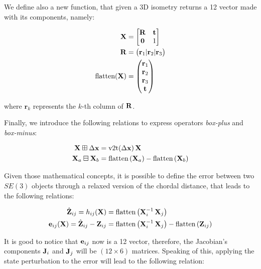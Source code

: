 We define also a new function, that given a 3D isometry returns a 12 vector made with its components, namely:

\begin{align}
    \mathbf{X} &= 
        \begin{bmatrix}
            \mathbf{R} & \mathbf{t} \\ \mathbf{0} & 1
        \end{bmatrix} \nonumber \\
    \mathbf{R} &= \begin{pmatrix} \mathbf{r}_1 | \mathbf{r}_2 | \mathbf{r}_3 \end{pmatrix} \nonumber \\
    \text{flatten}(\mathbf{X}) &= \begin{pmatrix} \mathbf{r}_1 \\ \mathbf{r}_2 \\ \mathbf{r}_3 \\ \mathbf{t} \end{pmatrix}
    \label{eq:flatten_isometry_operator}
\end{align}

\noindent where $\mathbf{r}_k$ represents the $k$-th column of $\mathbf{R}$.

Finally, we introduce the following relations to express operators \textit{box-plus} and \textit{box-minus}:

\begin{align}
    \label{eq:boxplus_se3}
    \SState \boxplus \dx &= \v2t(\dx)\, \SState \\
    \label{eq:boximus_se3}
    \SState_a \boxminus \SState_b &= \flatten{\SState_a} - \flatten{\SState_b}
\end{align}

Given those mathematical concepts, it is possible to define the error between two $SE(3)$ objects through a relaxed version of the chordal distance, that leads to the following relations:

\begin{align}
    \label{eq:prediction_se3}
    \hat{\mathbf{Z}}_{ij} = h_{ij}(\mathbf{X}) &= \text{flatten}\left({\mathbf{X}_i^{-1}\,\mathbf{X}_j}\right) \\
    \label{eq:error_se3}
    \mathbf{e}_{ij}(\mathbf{X}) = \hat{\mathbf{Z}}_{ij} - \mathbf{Z}_{ij} &= \text{flatten}\left({\mathbf{X}_i^{-1}\, \mathbf{X}_j}\right) - \text{flatten}\left({\mathbf{Z}_{ij}}\right)
\end{align}

\noindent It is good to notice that $\mathbf{e}_{ij}$ now is a 12 vector, therefore, the Jacobian's components $\mathbf{J}_i$ and $\mathbf{J}_j$ will be $(12\times6)$ matrices. Speaking of this, applying the state perturbation to the error will lead to the following relation:

